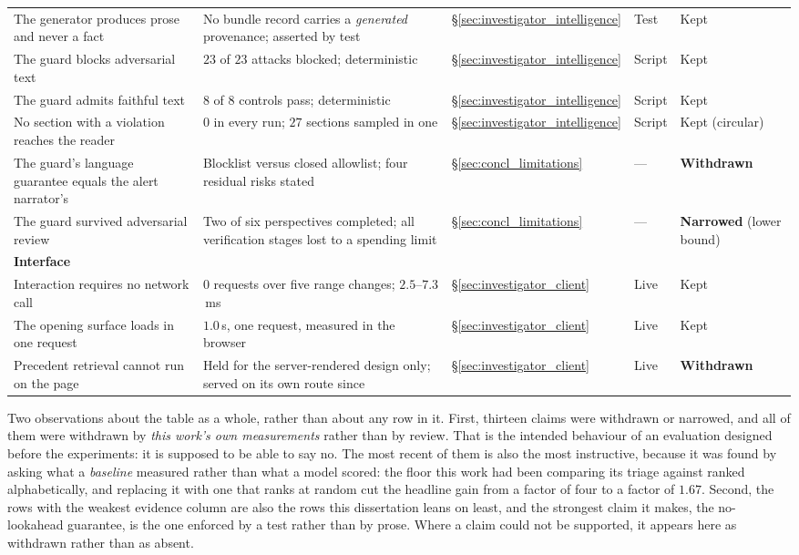 \begin{table}[ht]
\begin{tabular}{p{4.6cm} p{3.5cm} p{1.6cm} p{1.2cm} p{1.7cm}}
The generator produces prose and never a fact & No bundle record carries a \emph{generated} provenance; asserted by test & §\ref{sec:investigator_intelligence} & Test & Kept \\
The guard blocks adversarial text & $23$ of $23$ attacks blocked; deterministic & §\ref{sec:investigator_intelligence} & Script & Kept \\
The guard admits faithful text & $8$ of $8$ controls pass; deterministic & §\ref{sec:investigator_intelligence} & Script & Kept \\
No section with a violation reaches the reader & $0$ in every run; $27$ sections sampled in one & §\ref{sec:investigator_intelligence} & Script & Kept (circular) \\
The guard's language guarantee equals the alert narrator's & Blocklist versus closed allowlist; four residual risks stated & §\ref{sec:concl_limitations} & --- & \textbf{Withdrawn} \\
The guard survived adversarial review & Two of six perspectives completed; all verification stages lost to a spending limit & §\ref{sec:concl_limitations} & --- & \textbf{Narrowed} (lower bound) \\
\midrule
\multicolumn{5}{l}{\textbf{Interface}} \\
Interaction requires no network call & $0$ requests over five range changes; $2.5$--$7.3$\,ms & §\ref{sec:investigator_client} & Live & Kept \\
The opening surface loads in one request & $1.0$\,s, one request, measured in the browser & §\ref{sec:investigator_client} & Live & Kept \\
Precedent retrieval cannot run on the page & Held for the server-rendered design only; served on its own route since & §\ref{sec:investigator_client} & Live & \textbf{Withdrawn} \\
\bottomrule
\end{tabular}
\end{table}

Two observations about the table as a whole, rather than about any row in it. First, thirteen claims were
withdrawn or narrowed, and all of them were withdrawn by \emph{this work's own measurements} rather
than by review. That is the intended behaviour of an evaluation designed before the experiments: it is
supposed to be able to say no. The most recent of them is also the most instructive, because it was
found by asking what a \emph{baseline} measured rather than what a model scored: the floor this work
had been comparing its triage against ranked alphabetically, and replacing it with one that ranks at
random cut the headline gain from a factor of four to a factor of $1.67$. Second, the rows with the weakest evidence column are also the rows
this dissertation leans on least, and the strongest claim it makes, the no-lookahead guarantee, is the
one enforced by a test rather than by prose. Where a claim could not be supported, it appears here as
withdrawn rather than as absent.

